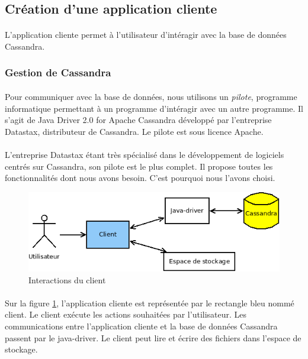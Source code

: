 \documentclass[12pt]{article}
\begin{document}
\subsection{Création d'une application cliente}

\paragraph{} L'application cliente permet à l'utilisateur d'intéragir avec la base de données Cassandra.

\subsubsection{Gestion de Cassandra}

\paragraph{} Pour communiquer avec la base de données, nous utilisons un \textit{pilote}, programme informatique permettant à un programme d'intéragir avec un autre programme.
Il s'agit de Java Driver 2.0 for Apache Cassandra développé par l'entreprise Datastax, distributeur de Cassandra. Le pilote est sous licence Apache.

\paragraph{} L'entreprise Datastax étant très spécialisé dans le développement de logiciels centrés sur Cassandra, son pilote est le plus complet. Il propose
toutes les fonctionnalités dont nous avons besoin. C'est pourquoi nous l'avons choisi.

\begin{figure}[h]
	\centering
		\includegraphics[width=12cm]{images/client/acteurs.png}
	\caption{Interactions du client \label{fig:client_acteurs}}
\end{figure}

\paragraph{} Sur la figure \ref{fig:client_acteurs}, l'application cliente est représentée par le rectangle bleu nommé client.
Le client exécute les actions souhaitées par l'utilisateur. Les communications entre l'application cliente et la base de données Cassandra passent par le java-driver.
Le client peut lire et écrire des fichiers dans l'espace de stockage.
\end{document}
